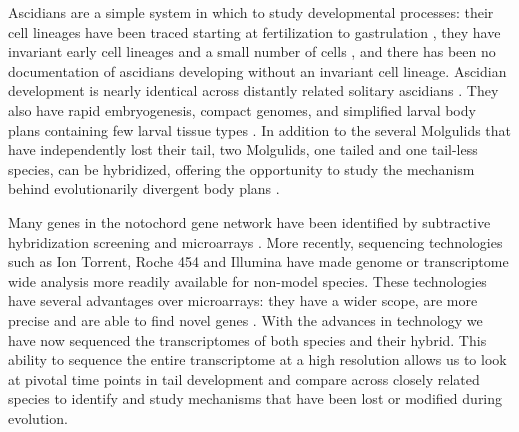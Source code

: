 Ascidians are a simple system in which to study developmental processes: their cell lineages have been traced starting at fertilization \cite{nishida_cell_1983} to gastrulation \cite{nishida_cell_1985,nishida_cell_1987}, they have invariant early cell lineages and a small number of cells \cite{lemaire_evolutionary_2011}, and there has been no documentation of ascidians developing without an invariant cell lineage.  Ascidian development is nearly identical across distantly related solitary ascidians \cite{lemaire_ascidians_2008,nishida_cell_2014}. They also have rapid embryogenesis, compact genomes, and simplified larval body plans containing few larval tissue types \cite{corbo_characterization_1997,jeffery_minireview_2002,dehal_draft_2002}.  %
In addition to the several Molgulids that have independently lost their tail, two Molgulids, one tailed and one tail-less species, can be hybridized, offering the opportunity to study the mechanism behind evolutionarily divergent body plans \cite{jeffery_evolutionary_1991}. %

Many genes in the notochord gene network have been identified by subtractive hybridization screening and microarrays \cite{jeffery_factors_1992,hotta_characterization_2000,gyoja_analysis_2007,kobayashi_differential_2013}. More recently, sequencing technologies such as Ion Torrent, Roche 454 and Illumina have made genome or transcriptome wide analysis more readily available for non-model species. These technologies have several advantages over microarrays: they have a wider scope, are more precise and are able to find novel genes \cite{marioni_rna-seq:_2008}. With the advances in technology we have now sequenced the transcriptomes of both species and their hybrid. This ability to sequence the entire transcriptome at a high resolution allows us to look at pivotal time points in tail development and compare across closely related species to identify and study mechanisms that have been lost or modified during evolution. 


